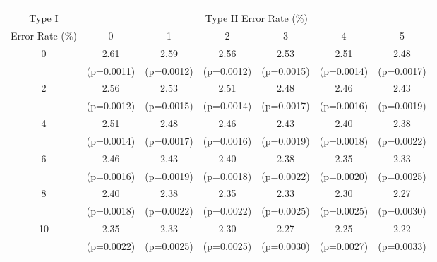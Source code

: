 \scriptsize{
\begin{tabular}{c|*{6}{c}}
\hline\hline \\[-8pt]
Type I & \multicolumn{6}{c}{Type II Error Rate (\%)} \\
Error Rate (\%)   & 0 & 1 & 2 & 3 & 4 & 5 \\ \hline
0 & 2.61 & 2.59 & 2.56 & 2.53 & 2.51 & 2.48 \\
 & (p=0.0011) & (p=0.0012) & (p=0.0012) & (p=0.0015) & (p=0.0014) & (p=0.0017) \\
[1em]
2 & 2.56 & 2.53 & 2.51 & 2.48 & 2.46 & 2.43 \\
 & (p=0.0012) & (p=0.0015) & (p=0.0014) & (p=0.0017) & (p=0.0016) & (p=0.0019) \\
[1em]
4 & 2.51 & 2.48 & 2.46 & 2.43 & 2.40 & 2.38 \\
 & (p=0.0014) & (p=0.0017) & (p=0.0016) & (p=0.0019) & (p=0.0018) & (p=0.0022) \\
[1em]
6 & 2.46 & 2.43 & 2.40 & 2.38 & 2.35 & 2.33 \\
 & (p=0.0016) & (p=0.0019) & (p=0.0018) & (p=0.0022) & (p=0.0020) & (p=0.0025) \\
[1em]
8 & 2.40 & 2.38 & 2.35 & 2.33 & 2.30 & 2.27 \\
 & (p=0.0018) & (p=0.0022) & (p=0.0022) & (p=0.0025) & (p=0.0025) & (p=0.0030) \\
[1em]
10 & 2.35 & 2.33 & 2.30 & 2.27 & 2.25 & 2.22 \\
 & (p=0.0022) & (p=0.0025) & (p=0.0025) & (p=0.0030) & (p=0.0027) & (p=0.0033) \\
\hline \hline
\end{tabular}
}
